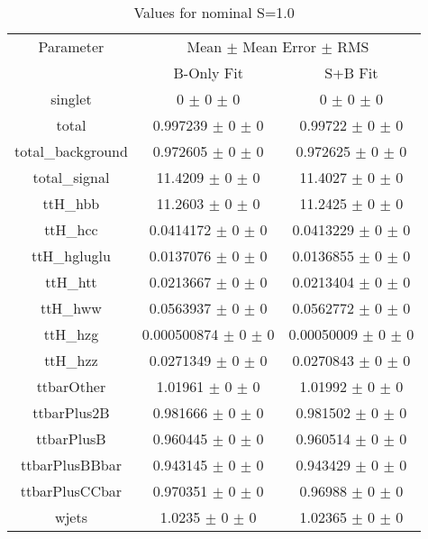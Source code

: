 \begin{table}
\centering
\caption{Values for nominal S=1.0}
\begin{tabular}{ccc}
\toprule
Parameter 	& \multicolumn{2}{c}{Mean $\pm$ Mean Error $\pm$ RMS}\\
 	& B-Only Fit & S+B Fit\\
\midrule
singlet 	& \num{0} $\pm$ \num{0} $\pm$ \num{0} 	& \num{0} $\pm$ \num{0} $\pm$ \num{0}\\
total 	& \num{0.997239} $\pm$ \num{0} $\pm$ \num{0} 	& \num{0.99722} $\pm$ \num{0} $\pm$ \num{0}\\
total\_background 	& \num{0.972605} $\pm$ \num{0} $\pm$ \num{0} 	& \num{0.972625} $\pm$ \num{0} $\pm$ \num{0}\\
total\_signal 	& \num{11.4209} $\pm$ \num{0} $\pm$ \num{0} 	& \num{11.4027} $\pm$ \num{0} $\pm$ \num{0}\\
ttH\_hbb 	& \num{11.2603} $\pm$ \num{0} $\pm$ \num{0} 	& \num{11.2425} $\pm$ \num{0} $\pm$ \num{0}\\
ttH\_hcc 	& \num{0.0414172} $\pm$ \num{0} $\pm$ \num{0} 	& \num{0.0413229} $\pm$ \num{0} $\pm$ \num{0}\\
ttH\_hgluglu 	& \num{0.0137076} $\pm$ \num{0} $\pm$ \num{0} 	& \num{0.0136855} $\pm$ \num{0} $\pm$ \num{0}\\
ttH\_htt 	& \num{0.0213667} $\pm$ \num{0} $\pm$ \num{0} 	& \num{0.0213404} $\pm$ \num{0} $\pm$ \num{0}\\
ttH\_hww 	& \num{0.0563937} $\pm$ \num{0} $\pm$ \num{0} 	& \num{0.0562772} $\pm$ \num{0} $\pm$ \num{0}\\
ttH\_hzg 	& \num{0.000500874} $\pm$ \num{0} $\pm$ \num{0} 	& \num{0.00050009} $\pm$ \num{0} $\pm$ \num{0}\\
ttH\_hzz 	& \num{0.0271349} $\pm$ \num{0} $\pm$ \num{0} 	& \num{0.0270843} $\pm$ \num{0} $\pm$ \num{0}\\
ttbarOther 	& \num{1.01961} $\pm$ \num{0} $\pm$ \num{0} 	& \num{1.01992} $\pm$ \num{0} $\pm$ \num{0}\\
ttbarPlus2B 	& \num{0.981666} $\pm$ \num{0} $\pm$ \num{0} 	& \num{0.981502} $\pm$ \num{0} $\pm$ \num{0}\\
ttbarPlusB 	& \num{0.960445} $\pm$ \num{0} $\pm$ \num{0} 	& \num{0.960514} $\pm$ \num{0} $\pm$ \num{0}\\
ttbarPlusBBbar 	& \num{0.943145} $\pm$ \num{0} $\pm$ \num{0} 	& \num{0.943429} $\pm$ \num{0} $\pm$ \num{0}\\
ttbarPlusCCbar 	& \num{0.970351} $\pm$ \num{0} $\pm$ \num{0} 	& \num{0.96988} $\pm$ \num{0} $\pm$ \num{0}\\
wjets 	& \num{1.0235} $\pm$ \num{0} $\pm$ \num{0} 	& \num{1.02365} $\pm$ \num{0} $\pm$ \num{0}\\
\bottomrule
\end{tabular}
\end{table}